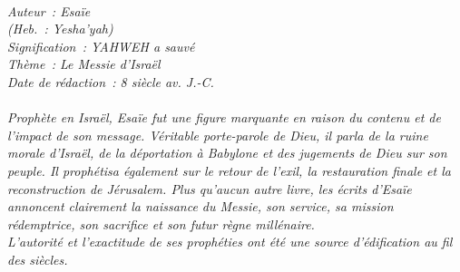 \BFont
\noindent\hrulefill
{\footnotesize
\textit{
\bigskip
{\centering{}
\\Auteur~: Esaïe
\\(Heb.~: Yesha'yah)
\\Signification~: YAHWEH a sauvé
\\Thème~: Le Messie d'Israël
\\Date de rédaction~: 8 siècle av. J.-C.\\}
}
\textit{
\\Prophète en Israël, Esaïe fut une figure marquante en raison du contenu et de l'impact de son message. Véritable porte-parole de Dieu, il parla de la ruine morale d'Israël, de la déportation à Babylone et des jugements de Dieu sur son peuple. Il prophétisa également sur le retour de l'exil, la restauration finale et la reconstruction de Jérusalem. Plus qu'aucun autre livre, les écrits d'Esaïe annoncent clairement la naissance du Messie, son service, sa mission rédemptrice, son sacrifice et son futur règne millénaire.
\\L'autorité et l'exactitude de ses prophéties ont été une source d'édification au fil des siècles.\bigskip
}
}
\par\nobreak\noindent\hrulefill

